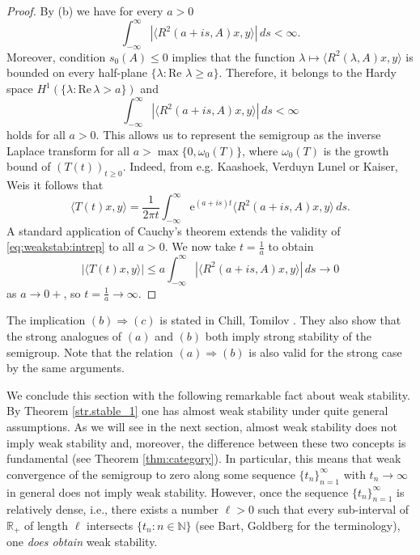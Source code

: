 \documentclass[11pt,intlimits, draft,oneside]{amsart}
\theoremstyle{definition}
\renewcommand{\Re}{\mathrm{Re}\,}
\def\dd{\,d}
\def\ee{\mathrm{e}}
\def\RR{\mathbb{R}}
\def\NN{\mathbb{N}}
\begin{document}
\begin{proof}
By (b) we have for every $a>0$
%
\begin{equation*}
\int_{-\infty}^{\infty} |\langle R^2(a+is,A)x,y \rangle| \dd s <
\infty. \end{equation*}
%
Moreover, condition $s_0(A)\leq 0$ implies that the function
$\lambda \mapsto \langle R^2(\lambda,A)x,y \rangle$ is bounded on
every half-plane $\{\lambda:\Re\, \lambda \geq a\}$. Therefore, it
belongs to the Hardy space $H^1(\{\lambda:\Re \lambda > a \})$
and
%
\begin{equation*}\int_{-\infty}^{\infty} |\langle R^2(a+is,A)x,y \rangle| \dd s < \infty \end{equation*}
%
holds for all $a>0$.
%
This allows us to represent the semigroup as the inverse Laplace
transform for all $a>\max\{0, \omega_0(T)\}$, where $\omega_0(T)$ is
the growth bound of $(T(t))_{t\geq 0}$. Indeed, from e.g. Kaashoek,
Verduyn Lunel \cite{kaashoek/lunel:1994} or Kaiser, Weis
\cite{kaiser/weis:2003} it follows that
%
\begin{equation} \label{eq:weakstab:intrep}
\langle T(t)x,y \rangle = \frac{1}{2\pi t}  \int_{-\infty}^{\infty}
\ee^{(a+is)t} \langle R^2(a+is,A)x,y \rangle \dd s.
\end{equation}
A standard application of Cauchy's theorem extends the validity of
\eqref{eq:weakstab:intrep} to all $a>0$. We now take $t =
\frac{1}{a}$ to obtain
%
\begin{equation*}\left| \langle T(t)x,y \rangle \right|
  \leq a \int_{-\infty}^{\infty} | \langle R^2(a+is,A)x,y \rangle | \dd s \to 0\end{equation*}
%
as $a \to 0+$, so $t=\frac{1}{a} \to \infty$.
\end{proof}

The implication $(b)\Rightarrow (c)$ is stated in Chill, Tomilov
\cite{chill/tomilov:2003}. They also show that the strong analogues
of $(a)$ and $(b)$ both imply strong stability of the semigroup.
Note that the relation $(a) \Rightarrow (b)$ is also valid for the
strong case by the same arguments.

%
\smallskip

We conclude this section with the following remarkable fact about
weak stability. By Theorem \ref{str.stable_1} one has almost weak
stability under quite general assumptions. As we will see in the
next section, almost weak stability does not imply weak
stability and, moreover, the difference between these two concepts
is fundamental (see Theorem \ref{thm:category}). In particular, this
means that weak convergence of the semigroup to zero along some
sequence $\{t_n\}_{n=1}^\infty$ with $t_n\to \infty$ in general does
not imply weak stability. However, once the sequence
$\{t_n\}_{n=1}^\infty$ is relatively dense, 
i.e., there exists a
number $\ell>0$ such that every sub-interval of $\RR_+$ of length $\ell$
intersects $\{t_n:n\in\NN\}$ (see Bart, Goldberg \cite{bart/goldberg:1978} for the terminology),  one \emph{does obtain} weak
stability.
\end{document}

